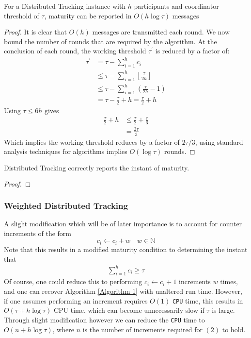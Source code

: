 \begin{theorem} For a Distributed Tracking instance with $h$ participants and coordinator threshold of $\tau$, maturity can be reported in $O(h\log\tau)$ messages
\end{theorem}
\begin{proof}
    It is clear that $O(h)$ messages are transmitted each round. We now bound the number of rounds that are required by the algorithm. At the conclusion of each round, the working threshold $\tau^\prime$ is reduced by a factor of: 
    \begin{align*}
        \tau^\prime &= \tau - \sum_{i=1}^{h}c_i \\
        &\leq \tau - \sum_{i=1}^{h}\left\lfloor \frac{\tau}{2h}\right\rfloor \\
        &\leq \tau - \sum_{i=1}^{h} \left(\frac{\tau}{2h} - 1\right) \\
        &= \tau - \frac{\tau}{2} + h = \frac{\tau}{2} + h
    \end{align*}
    Using $\tau \leq 6h$ gives
    \begin{align*}
        \frac{\tau}{2} +h &\leq \frac{\tau}{2} + \frac{\tau}{6} \\
        &= \frac{2\tau}{3}
    \end{align*}
    Which implies the working threshold reduces by a factor of $2\tau/3$, using standard analysis techniques for algorithms implies $O(\log \tau)$ rounds. 
\end{proof}


\begin{theorem} Distributed Tracking correctly reports the instant of maturity.
\end{theorem}
\begin{proof}
    
\end{proof}


\subsubsection*{Weighted Distributed Tracking}

A slight modification which will be of later importance is to account for counter increments of the form
$$c_i \leftarrow c_i + w \quad w \in \mathbb{N}$$
Note that this results in a modified maturity condition to determining the instant that 
\begin{align}
    \sum_{i=1}^{h}c_i \geq \tau
\end{align}
Of course, one could reduce this to performing $c_i \leftarrow c_i +1$ increments $w$ times, and one can recover Algorithm \ref{Algorithm 1} with unaltered run time. However, if one assumes performing an increment requires $O(1)$ \texttt{CPU} time, this results in $O(\tau + h\log\tau)$ CPU time, which can become unnecessarily slow if $\tau$ is large.
Through slight modification however we can reduce the \texttt{CPU} time to $O(n+h\log\tau)$, where $n$ is the number of increments required for $(2)$ to hold.

